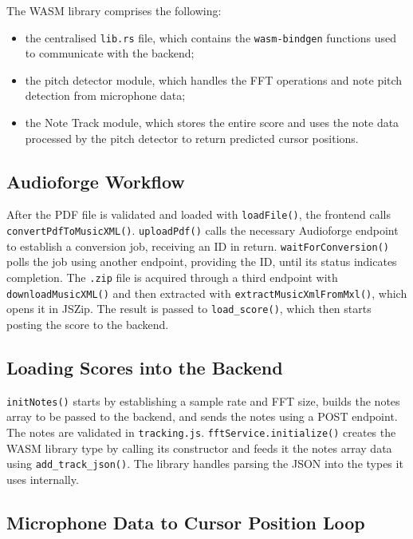 The WASM library comprises the following:
\begin{itemize}
    \item the centralised \texttt{lib.rs} file, which contains the \texttt{wasm-bindgen} functions used to communicate with the backend;
    \item the pitch detector module, which handles the FFT operations and note pitch detection from microphone data;
    \item the Note Track module, which stores the entire score and uses the note data processed by the pitch detector to return predicted cursor positions.
\end{itemize}

\subsection{Audioforge Workflow}

After the PDF file is validated and loaded with \texttt{loadFile()}, the frontend calls \texttt{convertPdfToMusicXML()}. \texttt{uploadPdf()} calls the necessary Audioforge endpoint to establish a conversion job, receiving an ID in return. \texttt{waitForConversion()} polls the job using another endpoint, providing the ID, until its status indicates completion. The \texttt{.zip} file is acquired through a third endpoint with \texttt{downloadMusicXML()} and then extracted with \texttt{extractMusicXmlFromMxl()}, which opens it in JSZip. The result is passed to \texttt{load\_score()}, which then starts posting the score to the backend.

\subsection{Loading Scores into the Backend}

\texttt{initNotes()} starts by establishing a sample rate and FFT size, builds the notes array to be passed to the backend, and sends the notes using a POST endpoint. The notes are validated in \texttt{tracking.js}. \texttt{fftService.initialize()} creates the WASM library type by calling its constructor and feeds it the notes array data using \texttt{add\_track\_json()}. The library handles parsing the JSON into the types it uses internally.

\subsection{Microphone Data to Cursor Position Loop}

